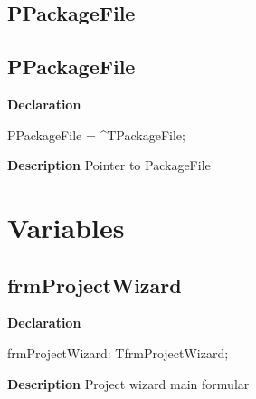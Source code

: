 \documentclass{report}
\newif\ifpdf
\begin{document}
\subsection*{\large{\textbf{PPackageFile}}\normalsize\hspace{1ex}\hrulefill}
\else
\subsection*{PPackageFile}
\fi
\label{prjwizard-PPackageFile}
\begin{list}{}{
\setlength{\itemindent}{0cm}
\setlength{\listparindent}{0cm}
\setlength{\leftmargin}{\evensidemargin}
\addtolength{\leftmargin}{\tmplength}
\settowidth{\labelsep}{X}
\addtolength{\leftmargin}{\labelsep}
\setlength{\labelwidth}{\tmplength}
}
\item[\textbf{Declaration}\hfill]
\ifpdf
\begin{flushleft}
\fi
\begin{ttfamily}
PPackageFile = {\^{}}TPackageFile;\end{ttfamily}

\ifpdf
\end{flushleft}
\fi

\par
\item[\textbf{Description}]
Pointer to PackageFile

\end{list}
\section{Variables}
\ifpdf
\subsection*{\large{\textbf{frmProjectWizard}}\normalsize\hspace{1ex}\hrulefill}
\else
\subsection*{frmProjectWizard}
\fi
\label{prjwizard-frmProjectWizard}
\begin{list}{}{
\setlength{\itemindent}{0cm}
\setlength{\listparindent}{0cm}
\setlength{\leftmargin}{\evensidemargin}
\addtolength{\leftmargin}{\tmplength}
\settowidth{\labelsep}{X}
\addtolength{\leftmargin}{\labelsep}
\setlength{\labelwidth}{\tmplength}
}
\item[\textbf{Declaration}\hfill]
\ifpdf
\begin{flushleft}
\fi
\begin{ttfamily}
frmProjectWizard: TfrmProjectWizard;\end{ttfamily}

\ifpdf
\end{flushleft}
\fi

\par
\item[\textbf{Description}]
Project wizard main formular

\end{list}
\ifpdf
\end{document}
